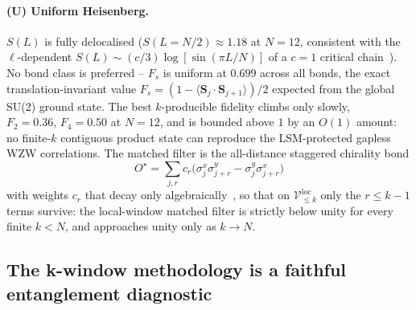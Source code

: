 \documentclass[11pt,a4paper]{article}
\newcommand{\Vloc}[1]{\mathcal{V}^{\mathrm{loc}}_{\le #1}}
\begin{document}
\paragraph{(U) Uniform Heisenberg.}  $S(L)$ is fully delocalised
($S(L=N/2)\approx 1.18$ at $N=12$, consistent with the
$\ell$-dependent $S(L)\sim(c/3)\log[\sin(\pi L/N)]$ of a $c=1$
critical chain~\cite{Calabrese2004,GogolinBook}).  No bond class
is preferred -- $F_s$ is uniform at $0.699$ across all bonds, the
exact translation-invariant value $F_s=(1-\langle\mathbf S_j\!\cdot\!\mathbf S_{j+1}\rangle)/2$
expected from the global SU(2) ground state.  The best
$k$-producible fidelity climbs only slowly,
$F_2=0.36,\,F_4=0.50$ at $N=12$, and is bounded above $1$ by an
$O(1)$ amount: no finite-$k$ contiguous product state can
reproduce the LSM-protected gapless WZW correlations.  The
matched filter is the all-distance staggered chirality bond
\begin{equation}
   O^\star=\sum_{j,r}c_r\bigl(\sigma^x_j\sigma^y_{j+r}-\sigma^y_j\sigma^x_{j+r}\bigr)
   \label{eq:WZW_bond}
\end{equation}
with weights $c_r$ that decay only algebraically~\cite{Affleck1986},
so that on $\Vloc{k}$ only the $r\le k-1$ terms survive: the
local-window matched filter is strictly below unity for every
finite $k<N$, and approaches unity only as $k\to N$.

\subsection{The k-window methodology is a faithful entanglement
diagnostic}
\label{sec:k_window_faithful}
\end{document}
